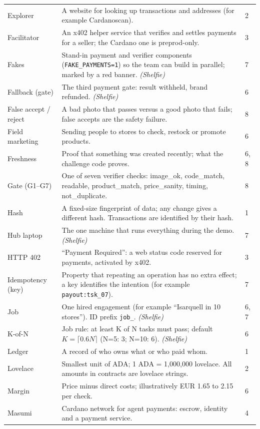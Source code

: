 {\begin{longtable}{@{}p{3.4cm}p{10.6cm}p{1.2cm}@{}}
Explorer & A website for looking up transactions and addresses (for example Cardanoscan). & 2\\
Facilitator & An x402 helper service that verifies and settles payments for a seller; the Cardano one is preprod-only. & 3\\
Fakes & Stand-in payment and verifier components (\texttt{FAKE\_PAYMENTS=1}) so the team can build in parallel; marked by a red banner. \emph{(Shelfie)} & 7\\
Fallback (gate) & The third payment gate: result withheld, brand refunded. \emph{(Shelfie)} & 6\\
False accept / reject & A bad photo that passes versus a good photo that fails; false accepts are the safety failure. & 8\\
Field marketing & Sending people to stores to check, restock or promote products. & 6\\
Freshness & Proof that something was created recently; what the challenge code proves. & 6, 8\\
Gate (G1--G7) & One of seven verifier checks: image\_ok, code\_match, readable, product\_match, price\_sanity, timing, not\_duplicate. & 8\\
Hash & A fixed-size fingerprint of data; any change gives a different hash. Transactions are identified by their hash. & 1\\
Hub laptop & The one machine that runs everything during the demo. \emph{(Shelfie)} & 7\\
HTTP 402 & ``Payment Required'': a web status code reserved for payments, activated by x402. & 3\\
Idempotency (key) & Property that repeating an operation has no extra effect; a key identifies the intention (for example \texttt{payout:tsk\_07}). & 7\\
Job & One hired engagement (for example ``Isarquell in 10 stores''). ID prefix \texttt{job\_}. \emph{(Shelfie)} & 6, 7\\
K-of-N & Job rule: at least K of N tasks must pass; default $K=\lceil 0.6N\rceil$ (N=5: 3; N=10: 6). \emph{(Shelfie)} & 6\\
Ledger & A record of who owns what or who paid whom. & 1\\
Lovelace & Smallest unit of ADA; 1 ADA = 1,000,000 lovelace. All amounts in contracts are lovelace strings. & 2\\
Margin & Price minus direct costs; illustratively EUR 1.65 to 2.15 per check. & 6\\
Masumi & Cardano network for agent payments: escrow, identity and a payment service. & 4\\

\end{longtable}}
